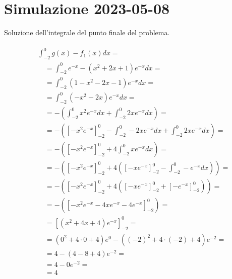 \documentclass[a4paper, 12pt]{article}
\begin{document}
\section*{Simulazione 2023-05-08}
Soluzione dell'integrale del punto finale del problema.

\begin{equation*}
    \begin{aligned}
        \begin{split}
            & \int_{-2}^{0} g(x) - f_1(x) dx = \\
            & \quad = \int_{-2}^{0} e^{-x} - (x^2 + 2x + 1) e^{-x} dx = \\
            & \quad = \int_{-2}^{0} (1 - x^2 - 2x - 1) e^{-x} dx = \\
            & \quad = \int_{-2}^{0} (-x^2 - 2x) e^{-x} dx = \\
            & \quad = -(\int_{-2}^{0} x^2 e^{-x} dx + \int_{-2}^{0} 2x e^{-x} dx) = \\
            & \quad = -(\left[ -x^2 e^{-x} \right]_{-2}^{0} - \int_{-2}^{0} -2x e^{-x} dx + \int_{-2}^{0} 2x e^{-x} dx) = \\
            & \quad = -(\left[ -x^2 e^{-x} \right]_{-2}^{0} + 4\int_{-2}^{0} x e^{-x} dx) = \\
            & \quad = -(\left[ -x^2 e^{-x} \right]_{-2}^{0} + 4(\left[ -x e^{-x} \right]_{-2}^{0} - \int_{-2}^{0} -e^{-x} dx)) = \\
            & \quad = -(\left[ -x^2 e^{-x} \right]_{-2}^{0} + 4(\left[ -x e^{-x} \right]_{-2}^{0} + \left[ -e^{-x} \right]_{-2}^{0})) = \\
            & \quad = -(\left[ -x^2 e^{-x} -4x e^{-x} -4e^{-x}\right]_{-2}^{0}) = \\
            & \quad = \left[ (x^2 + 4x + 4)e^{-x} \right]_{-2}^{0} = \\
            & \quad = (0^2 + 4\cdot 0 + 4)e^{0} - ((-2)^2 + 4\cdot (-2) + 4)e^{-2} = \\
            & \quad = 4 - (4 - 8 + 4)e^{-2} = \\
            & \quad = 4 - 0e^{-2} = \\
            & \quad = 4
        \end{split}
    \end{aligned}
\end{equation*}
\end{document}
